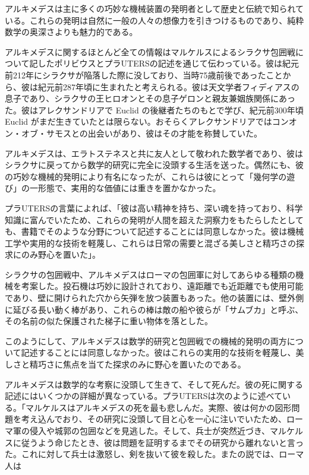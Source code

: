 \documentclass[a4paper,11pt,openany]{ltjsbook}
\begin{document}
アルキメデスは主に多くの巧妙な機械装置の発明者として歴史と伝統で知られている。これらの発明は自然に一般の人々の想像力を引きつけるものであり、純粋数学の奥深さよりも魅力的である。

アルキメデスに関するほとんど全ての情報はマルケルスによるシラクサ包囲戦について記したポリビウスとプラUTERSの記述を通じて伝わっている。彼は紀元前212年にシラクサが陥落した際に没しており、当時75歳前後であったことから、彼は紀元前287年頃に生まれたと考えられる。彼は天文学者フィディアスの息子であり、シラクサの王ヒロオンとその息子ゲロンと親友兼姻族関係にあった。彼はアレクサンドリアで Euclid の後継者たちのもとで学び、紀元前300年頃 Euclid がまだ生きていたとは限らない。おそらくアレクサンドリアではコンオン・オブ・サモスとの出会いがあり、彼はその才能を称賛していた。

アルキメデスは、エラトステネスと共に友人として敬われた数学者であり、彼はシラクサに戻ってから数学的研究に完全に没頭する生活を送った。偶然にも、彼の巧妙な機械的発明により有名になったが、これらは彼にとって「幾何学の遊び」の一形態で、実用的な価値には重きを置かなかった。

プラUTERSの言葉によれば、「彼は高い精神を持ち、深い魂を持っており、科学知識に富んでいたため、これらの発明が人間を超えた洞察力をもたらしたとしても、書籍でそのような分野について記述することには同意しなかった。彼は機械工学や実用的な技術を軽蔑し、これらは日常の需要と混ざる美しさと精巧さの探求にのみ野心を置いた」。

シラクサの包囲戦中、アルキメデスはローマの包囲軍に対してあらゆる種類の機械を考案した。投石機は巧妙に設計されており、遠距離でも近距離でも使用可能であり、壁に開けられた穴から矢弾を放つ装置もあった。他の装置には、壁外側に延びる長い動く棒があり、これらの棒は敵の船や彼らが「サムブカ」と呼ぶ、その名前の似た保護された梯子に重い物体を落とした。

このようにして、アルキメデスは数学的研究と包囲戦での機械的発明の両方について記述することには同意しなかった。彼はこれらの実用的な技術を軽蔑し、美しさと精巧さに焦点を当てた探求のみに野心を置いたのである。

アルキメデスは数学的な考察に没頭して生きて、そして死んだ。彼の死に関する記述にはいくつかの詳細が異なっている。プラUTERSは次のように述べている。「マルケルスはアルキメデスの死を最も悲しんだ。実際、彼は何かの図形問題を考え込んでおり、その研究に没頭して目と心を一心に注いでいたため、ローマ軍の侵入や城郭の包囲などを見逃した。そして、兵士が突然近づき、マルケルスに従うよう命じたとき、彼は問題を証明するまでその研究から離れないと言った。これに対して兵士は激怒し、剣を抜いて彼を殺した。またの説では、ローマ人は
\end{document}
